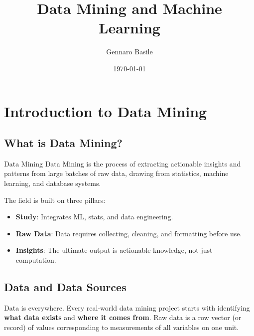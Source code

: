 \documentclass[11pt]{article}
\title{\Huge Data Mining and Machine Learning}
\author{\Large Gennaro Basile}
\date{\today}
\theoremstyle{smallexample}
\begin{document}
\maketitle
{}
\captionsetup[figure]{labelfont=bf}

\pagebreak

\tableofcontents
\pagebreak



\section{Introduction to Data Mining}

\subsection{What is Data Mining?}

\begin{defbox}{Data Mining}
    Data Mining is the process of extracting actionable insights and patterns from large batches of raw data, drawing from statistics, machine learning, and database systems.
\end{defbox}

The field is built on three pillars:
\begin{itemize}
    \item \textbf{Study}: Integrates ML, stats, and data engineering.
    \item \textbf{Raw Data}: Data requires collecting, cleaning, and formatting before use.
    \item \textbf{Insights}: The ultimate output is actionable knowledge, not just computation.
\end{itemize}

\subsection{Data and Data Sources}

Data is everywhere. Every real-world data mining project starts with identifying
\textbf{what data exists} and \textbf{where it comes from}. Raw data is a row vector
(or record) of values corresponding to measurements of all variables on one unit.
\end{document}
